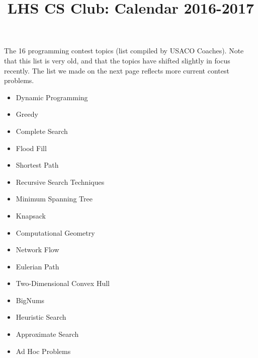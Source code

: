 \documentclass[11pt, oneside]{article}   	%
\title{LHS CS Club: Calendar 2016-2017}
\begin{document}
\maketitle

The 16 programming contest topics (list compiled by USACO Coaches). Note that this list is very old, and that the topics have shifted slightly in focus recently. The list we made on the next page reflects more current contest problems.
\begin{itemize}
\item Dynamic Programming
\item Greedy
\item Complete Search
\item Flood Fill
\item Shortest Path
\item Recursive Search Techniques
\item Minimum Spanning Tree
\item Knapsack
\item Computational Geometry
\item Network Flow
\item Eulerian Path
\item Two-Dimensional Convex Hull
\item BigNums
\item Heuristic Search
\item Approximate Search
\item Ad Hoc Problems
\end{itemize}

\newpage
\end{document}
